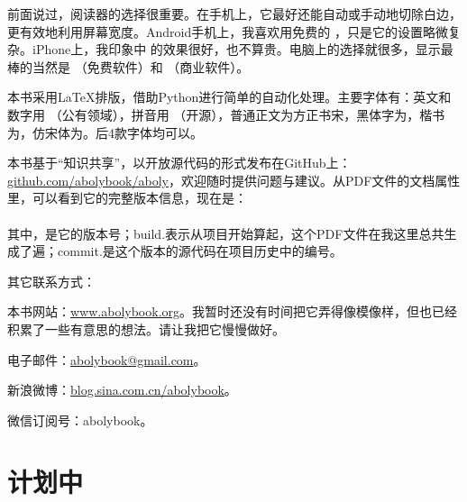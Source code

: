 前面说过，阅读器的选择很重要。在手机上，它最好还能自动或手动地切除白边，更有效地利用屏幕宽度。Android手机上，我喜欢用免费的 ，只是它的设置略微复杂。iPhone上，我印象中  的效果很好，也不算贵。电脑上的选择就很多，显示最棒的当然是 （免费软件）和 （商业软件）。

本书采用LaTeX排版，借助Python进行简单的自动化处理。主要字体有：英文和数字用 （公有领域），拼音用 （开源），普通正文为方正书宋，黑体字为，楷书为，仿宋体为。后4款字体均可以。

本书基于“知识共享”，以开放源代码的形式发布在GitHub上：\href{https://github.com/abolybook/aboly}{github.com/abolybook/aboly}，欢迎随时提供问题与建议。从PDF文件的文档属性里，可以看到它的完整版本信息，现在是：\\
\versioninfoaboly\\
其中，\projectversionnumber 是它的版本号；build.\buildnoaboly 表示从项目开始算起，这个PDF文件在我这里总共生成了\buildnoaboly 遍；commit.\lycommitno 是这个版本的源代码在项目历史中的编号。

其它联系方式：
\begin{lyitemize}
\item 本书网站：\href{http://www.abolybook.org/}{www.abolybook.org}。我暂时还没有时间把它弄得像模像样，但也已经积累了一些有意思的想法。请让我把它慢慢做好。
\item 电子邮件：\href{mailto:abolybook@gmail.com}{abolybook@gmail.com}。
\item 新浪微博：\href{http://blog.sina.com.cn/abolybook}{blog.sina.com.cn/abolybook}。
\item 微信订阅号：abolybook。
\end{lyitemize}


\lypdfbookmark\section*{计划中}

